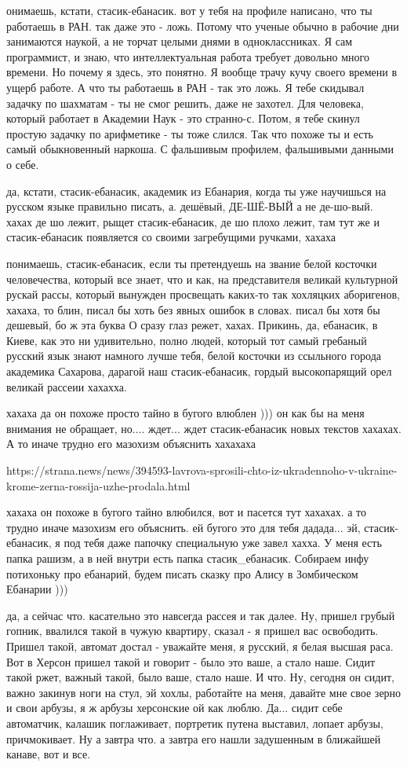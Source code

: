 онимаешь, кстати, стасик-ебанасик. вот у тебя на профиле написано, что ты
работаешь в РАН. так даже это - ложь. Потому что ученые обычно в рабочие дни
занимаются наукой, а не торчат целыми днями в одноклассниках. Я сам
программист, и знаю, что интеллектуальная работа требует довольно много
времени. Но почему я здесь, это понятно. Я вообще трачу кучу своего времени в
ущерб работе. А что ты работаешь в РАН - так это ложь. Я тебе скидывал задачку
по шахматам - ты не смог решить, даже не захотел. Для человека, который
работает в Академии Наук - это странно-с. Потом, я тебе скинул простую задачку
по арифметике - ты тоже слился. Так что похоже ты и есть самый обыкновенный
наркоша. С фальшивым профилем, фальшивыми данными о себе.

да, кстати, стасик-ебанасик, академик из Ебанария, когда ты уже научишься на
русском языке правильно писать, а.  дешёвый, ДЕ-ШЁ-ВЫЙ а не де-шо-вый. хахах де
шо лежит, рыщет стасик-ебанасик, де шо плохо лежит, там тут же и
стасик-ебанасик появляется со своими загребущими ручками, хахаха

понимаешь, стасик-ебанасик, если ты претендуешь на звание белой косточки
человечества, который все знает, что и как, на представителя великай культурной
рускай рассы, который вынужден просвещать каких-то так хохляцких аборигенов,
хахаха, то блин, писал бы хоть без явных ошибок в словах. писал бы хотя бы
дешевый, бо ж эта буква О сразу глаз режет, хахах. Прикинь, да, ебанасик, в
Киеве, как это ни удивительно, полно людей, который тот самый гребаный русский
язык знают намного лучше тебя, белой косточки из ссыльного города академика
Сахарова, дарагой наш стасик-ебанасик, гордый высокопарящий орел великай
рассеии хахахха.

хахаха да он похоже просто тайно в бугого влюблен ))) он как бы на меня
внимания не обращает, но.... ждет... ждет стасик-ебанасик новых текстов
хахахах. А то иначе трудно его мазохизм объяснить хахахаха

https://strana.news/news/394593-lavrova-sprosili-chto-iz-ukradennoho-v-ukraine-krome-zerna-rossija-uzhe-prodala.html

хахаха он похоже в бугого тайно влюбился, вот и пасется тут хахахах. а то
трудно иначе мазохизм его объяснить. ей бугого это для тебя дадада... эй,
стасик-ебанасик, я под тебя даже папочку специальную уже завел хахха. У меня
есть папка рашизм, а в ней внутри есть папка стасик_ебанасик. Собираем инфу
потихоньку про ебанарий, будем писать сказку про Алису в Зомбическом Ебанарии
)))

да, а сейчас что. касательно это навсегда рассея и так далее. Ну, пришел грубый
гопник, ввалился такой в чужую квартиру, сказал - я пришел вас освободить.
Пришел такой, автомат достал - уважайте меня, я русский, я белая высшая раса.
Вот в Херсон пришел такой и говорит - было это ваше, а стало наше. Сидит такой
ржет, важный такой, было ваше, стало наше. И что. Ну, сегодня он сидит, важно
закинув ноги на стул, эй хохлы, работайте на меня, давайте мне свое зерно и
свои арбузы, я ж арбузы херсонские ой как люблю. Да... сидит себе автоматчик,
калашик поглаживает, портретик путена выставил, лопает арбузы, причмокивает. Ну
а завтра что. а завтра его нашли задушенным в ближайшей канаве, вот и все.

